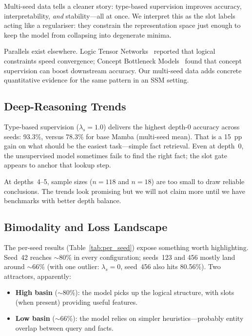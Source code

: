 \documentclass[conference]{IEEEtran}
\begin{document}
Multi-seed data tells a cleaner story: type-based supervision
improves accuracy, interpretability, \emph{and} stability---all
at once. We interpret this as the slot labels acting like a
regulariser: they constrain the representation space just enough
to keep the model from collapsing into degenerate minima.

Parallels exist elsewhere. Logic Tensor
Networks~\cite{badreddine2022ltn} reported that logical
constraints speed convergence; Concept Bottleneck
Models~\cite{koh2020cbm} found that concept supervision can
boost downstream accuracy. Our multi-seed data adds concrete
quantitative evidence for the same pattern in an SSM setting.

\subsection{Deep-Reasoning Trends}

Type-based supervision ($\lambda_s{=}1.0$) delivers the highest
depth-0 accuracy across seeds: 93.3\%, versus 78.3\% for base
Mamba (multi-seed mean). That is a 15~pp gain on what should be
the easiest task---simple fact retrieval. Even at depth~0, the
unsupervised model sometimes fails to find the right fact; the
slot gate appears to anchor that lookup step.

At depths~4--5, sample sizes ($n{=}118$ and $n{=}18$) are too
small to draw reliable conclusions. The trends look promising
but we will not claim more until we have benchmarks with better
depth balance.

\subsection{Bimodality and Loss Landscape}

The per-seed results (Table~\ref{tab:per_seed}) expose something
worth highlighting. Seed~42 reaches $\sim$80\% in every
configuration; seeds~123 and 456 mostly land around $\sim$66\%
(with one outlier: $\lambda_s{=}0$, seed~456 also hits 80.56\%).
Two attractors, apparently:

\begin{itemize}[nosep]
    \item \textbf{High basin} ($\sim$80\%): the model picks up
          the logical structure, with slots (when present)
          providing useful features.
    \item \textbf{Low basin} ($\sim$66\%): the model relies on
          simpler heuristics---probably entity overlap between
          query and facts.
\end{itemize}
\end{document}

